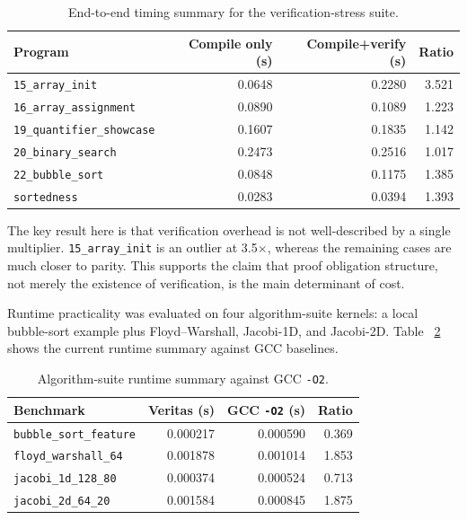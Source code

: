 \begin{table}[h]
  \centering
  \small
  \begin{tabular}{l r r r}
    \hline
    \textbf{Program}                  & \textbf{Compile only (s)} & \textbf{Compile+verify (s)} & \textbf{Ratio} \\
    \hline
    \texttt{15\_array\_init}          & 0.0648                    & 0.2280                      & 3.521          \\
    \texttt{16\_array\_assignment}    & 0.0890                    & 0.1089                      & 1.223          \\
    \texttt{19\_quantifier\_showcase} & 0.1607                    & 0.1835                      & 1.142          \\
    \texttt{20\_binary\_search}       & 0.2473                    & 0.2516                      & 1.017          \\
    \texttt{22\_bubble\_sort}         & 0.0848                    & 0.1175                      & 1.385          \\
    \texttt{sortedness}               & 0.0283                    & 0.0394                      & 1.393          \\
    \hline
  \end{tabular}
  \caption{End-to-end timing summary for the verification-stress suite.}
  \label{tab:timing-ratios}
\end{table}

The key result here is that verification overhead is not well-described by a
single multiplier. \texttt{15\_array\_init} is an outlier at 3.5$\times$,
whereas the remaining cases are much closer to parity. This supports the claim
that proof obligation structure, not merely the existence of verification, is
the main determinant of cost.

Runtime practicality was evaluated on four algorithm-suite kernels: a local
bubble-sort example plus Floyd--Warshall, Jacobi-1D, and Jacobi-2D. Table
~\ref{tab:runtime} shows the current runtime summary against GCC baselines.

\begin{table}[h]
  \centering
  \small
  \begin{tabular}{l r r r}
    \hline
    \textbf{Benchmark}             & \textbf{Veritas (s)} & \textbf{GCC \texttt{-O2} (s)} & \textbf{Ratio} \\
    \hline
    \texttt{bubble\_sort\_feature} & 0.000217             & 0.000590                      & 0.369          \\
    \texttt{floyd\_warshall\_64}   & 0.001878             & 0.001014                      & 1.853          \\
    \texttt{jacobi\_1d\_128\_80}   & 0.000374             & 0.000524                      & 0.713          \\
    \texttt{jacobi\_2d\_64\_20}    & 0.001584             & 0.000845                      & 1.875          \\
    \hline
  \end{tabular}
  \caption{Algorithm-suite runtime summary against GCC \texttt{-O2}.}
  \label{tab:runtime}
\end{table}

